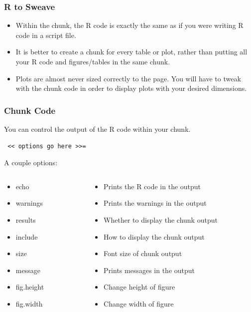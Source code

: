 \documentclass[nogin]{beamer}\usepackage[]{graphicx}\usepackage[]{color}
\begin{document}
\begin{frame}[fragile]
\frametitle{R to Sweave}
\begin{itemize}
\item Within the chunk, the R code is exactly the same as if you were writing R code in a script file.
\item It is better to create a chunk for every table or plot, rather than putting all your R code and figures/tables in the same chunk.
\item Plots are almost never sized correctly to the page. You will have to tweak with the chunk code in order to display plots with your desired dimensions.
\end{itemize}
\end{frame}

\begin{frame}[fragile]
\frametitle{Chunk Code}
\scriptsize
You can control the output of the R code within your chunk.
\begin{verbatim} << options go here >>= \end{verbatim}
A couple options:
\begin{columns}[T]
\begin{column}{.3\textwidth}
\begin{itemize}
\item echo
\item warnings
\item results
\item include
\item size
\item message
\item fig.height
\item fig.width
\end{itemize}
\end{column}
\begin{column}{.7\textwidth}
\begin{itemize}
\item Prints the R code in the output
\item Prints the warnings in the output
\item Whether to display the chunk output
\item How to display the chunk output
\item Font size of chunk output
\item Prints messages in the output
\item Change height of figure
\item Change width of figure
\end{itemize}
\end{column}
\end{columns}
\end{frame}
\end{document}
